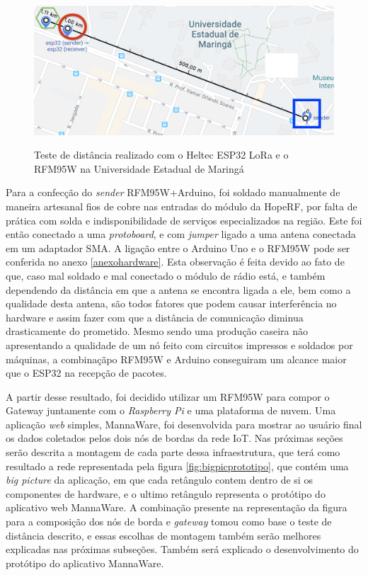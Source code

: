 \documentclass[
    hidelinks,
	12pt,				%
	openany,
	oneside, 
	a4paper,			%
	english,			%
	french,				%
	spanish,			%
	brazil				%
	]{abntex2}
\begin{document}
\begin{figure}[ht]
    \centering
    \caption{Teste de distância realizado com o Heltec ESP32 LoRa e o RFM95W na Universidade Estadual de Maringá}
    \includegraphics[width=1\textwidth]{distance_test.png}
    \label{fig:disttest}
\end{figure}

Para a confecção do \textit{sender} RFM95W+Arduino, foi soldado manualmente de maneira artesanal fios de cobre nas entradas do módulo da HopeRF, por falta de prática com solda e indisponibilidade de serviços especializados na região. Este foi então conectado a uma \textit{protoboard}, e com \textit{jumper} ligado a uma antena conectada em um adaptador SMA. A ligação entre o Arduino Uno e o RFM95W pode ser conferida no anexo \ref{anexohardware}. Esta observação é feita devido ao fato de que, caso mal soldado e mal conectado o módulo de rádio está, e também dependendo da distância em que a antena se encontra ligada a ele, bem como a qualidade desta antena, são todos fatores que podem causar interferência no hardware e assim fazer com que a distância de comunicação diminua drasticamente do prometido. Mesmo sendo uma produção caseira não apresentando a qualidade de um nó feito com circuitos impressos e soldados por máquinas, a combinaçãpo RFM95W e Arduino conseguiram um alcance maior que o ESP32 na recepção de pacotes.

A partir desse resultado, foi decidido utilizar um RFM95W para compor o Gateway juntamente com o \textit{Raspberry Pi} e uma plataforma de nuvem. Uma aplicação  \textit{web} simples, MannaWare, foi desenvolvida para mostrar ao usuário final os dados coletados pelos dois nós de bordas da rede IoT. Nas próximas seções serão descrita a montagem de cada parte dessa infraestrutura, que terá como resultado a rede representada pela figura \ref{fig:bigpicprototipo}, que contém uma \textit{big picture} da aplicação, em que cada retângulo contem dentro de si os componentes de hardware, e o ultimo retângulo representa o protótipo do aplicativo web MannaWare. A combinação presente na representação da figura para a composição dos nós de borda e \textit{gateway} tomou como base o teste de distância descrito, e essas escolhas de montagem também serão melhores explicadas nas próximas subseções. Também será explicado o desenvolvimento do protótipo do aplicativo MannaWare.
\end{document}

